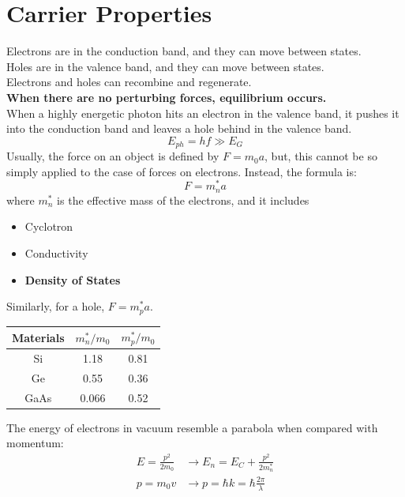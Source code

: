 \documentclass[nobib]{tufte-handout}
\begin{document}
\section{Carrier Properties}
Electrons are in the conduction band, and they can move between states.\\ Holes
are in the valence band, and they can move between states.\\ Electrons and
holes can recombine and regenerate.\\ \textbf{When there are no perturbing
    forces, equilibrium occurs.}\\ When a highly energetic photon hits an electron
in the valence band, it pushes it into the conduction band and leaves a hole
behind in the valence band.\\
\begin{equation*}
    E_{ph} = hf \gg E_G
\end{equation*}
Usually, the force on an object is defined by $F = m_0 a$, but, this cannot be so simply applied to the case of forces on electrons. Instead, the formula is:
\begin{equation*}
    F = m_n^* a
\end{equation*}
where $m_n^*$ is the effective mass of the electrons, and it includes
\begin{itemize}
    \item Cyclotron
    \item Conductivity
    \item \textbf{Density of States}
\end{itemize}
Similarly, for a hole, $F = m_p^* a$.
\begin{center}
    \begin{tabular}{|c|c|c|}
        \hline
        Materials & $m_n^*/m_0$ & $m_p^*/m_0$ \\
        \hline
        Si        & 1.18        & 0.81        \\
        \hline
        Ge        & 0.55        & 0.36        \\
        \hline
        GaAs      & 0.066       & 0.52        \\
        \hline
    \end{tabular}
\end{center}
The energy of electrons in vacuum resemble a parabola when compared with momentum:
\begin{align*}
    E = \frac{p^2}{2m_0} & \rightarrow E_n = E_C+\frac{p^2}{2m_n^*}             \\
    p = m_0 v            & \rightarrow p = \hbar k = \hbar \frac{2\pi}{\lambda}
\end{align*}
\end{document}
